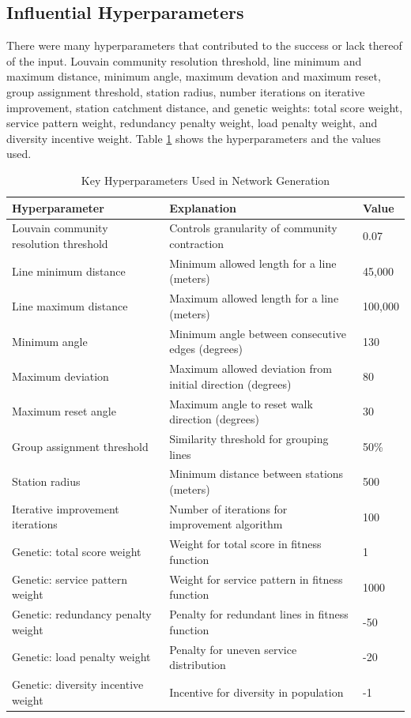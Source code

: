 \documentclass[manuscript,nonacm]{acmart}
\begin{document}
\subsection{Influential Hyperparameters}
There were many hyperparameters that contributed to the success or lack thereof of the input. Louvain community resolution threshold, line minimum and maximum distance, minimum angle, maximum devation and maximum reset, group assignment threshold, station radius, number iterations on iterative improvement, station catchment distance, and genetic weights: total score weight, service pattern weight, redundancy penalty weight, load penalty weight, and diversity incentive weight. Table \ref{tab:hyperparams} shows the hyperparameters and the values used.

\begin{table}[h]
\caption{Key Hyperparameters Used in Network Generation}
\label{tab:hyperparams}
\begin{tabular}{lll}
\toprule
\textbf{Hyperparameter} & \textbf{Explanation} & \textbf{Value} \\
\midrule
Louvain community resolution threshold & Controls granularity of community contraction & 0.07 \\
Line minimum distance & Minimum allowed length for a line (meters) & 45,000 \\
Line maximum distance & Maximum allowed length for a line (meters) & 100,000 \\
Minimum angle & Minimum angle between consecutive edges (degrees) & 130 \\
Maximum deviation & Maximum allowed deviation from initial direction (degrees) & 80 \\
Maximum reset angle & Maximum angle to reset walk direction (degrees) & 30 \\
Group assignment threshold & Similarity threshold for grouping lines & 50\% \\
Station radius & Minimum distance between stations (meters) & 500 \\
Iterative improvement iterations & Number of iterations for improvement algorithm & 100 \\
Genetic: total score weight & Weight for total score in fitness function & 1 \\
Genetic: service pattern weight & Weight for service pattern in fitness function & 1000 \\
Genetic: redundancy penalty weight & Penalty for redundant lines in fitness function & -50 \\
Genetic: load penalty weight & Penalty for uneven service distribution & -20 \\
Genetic: diversity incentive weight & Incentive for diversity in population & -1 \\
\bottomrule
\end{tabular}
\end{table}
\end{document}
